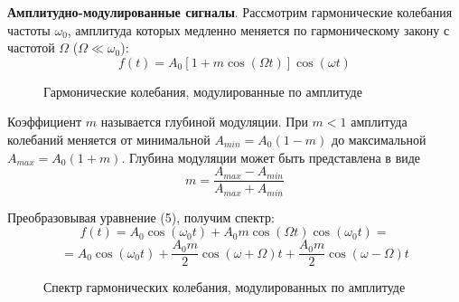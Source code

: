 \documentclass[14pt]{article}
\begin{document}
\vspace{1cm}
\textbf{Амплитудно-модулированные сигналы}. Рассмотрим гармонические колебания частоты $\omega_0$, амплитуда которых медленно меняется по гармоническому закону с частотой 
$\Omega$ ($\Omega \ll \omega_0$):
\begin{equation}
f(t) = A_0[1 + m\cos(\Omega t)]\cos(\omega t)
\end{equation}

\begin{figure}[h!]
	\caption{Гармонические колебания, модулированные по амплитуде}
	\label{fig:image}
\end{figure}

Коэффициент $m$ называется глубиной модуляции. При $m < 1$ амплитуда колебаний меняется от минимальной $A_{min} = A_0(1 - m)$ до максимальной $A_{max} = A_0(1 + m)$. Глубина модуляции может быть представлена в виде 
$$
	m = \frac{A_{max} - A_{min}}{A_{max} + A_{min}}
$$

Преобразовывая уравнение (5), получим спектр:
$$
	f(t) = A_0\cos(\omega_0t) + A_0m\cos(\Omega t)\cos(\omega_0t) = 
$$
$$
	= A_0\cos(\omega_0t) + \frac{A_0m}{2}\cos(\omega + \Omega)t + \frac{A_0m}{2}\cos(\omega - \Omega)t
$$

\begin{figure}[h!]
	\caption{Спектр гармонических колебания, модулированных по амплитуде}
	\label{fig:image}
\end{figure}
\end{document}
